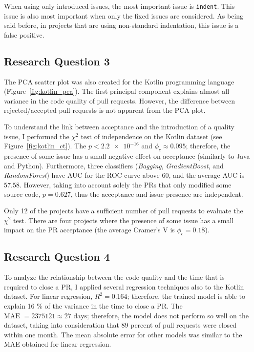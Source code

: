 \documentclass[digital,oneside,oldtable,nolof,nolot,nocover]{fithesis4}
\begin{document}
When using only introduced issues, the most important issue is \texttt{indent}.
This issue is also most important when only the fixed issues are considered.
As being said before, in projects that are using non-standard indentation,
this issue is a false positive.
\subsection{Research Question 3}
\label{sec:org53a6f45}
The PCA scatter plot was also created for the Kotlin programming language (Figure~\ref{fig:kotlin_pca}).
The first principal component explains almost all variance in the code quality of pull requests.
However, the difference between rejected/accepted pull requests is not apparent from the PCA plot.

To understand the link between acceptance and the introduction of a
quality issue, I performed the \(\chi^2\) test of independence
on the Kotlin dataset (see Figure~\ref{fig:kotlin_ct}).
The \(p < \num{2.2e-16}\) and \(\phi_c \approx 0.095\); therefore, the presence of some issue has a small
negative effect on acceptance (similarly to Java and Python).
Furthermore, three classifiers (\emph{Bagging}, \emph{GradientBoost}, and \emph{RandomForest})
have AUC for the ROC curve above 60, and the average AUC is \(57.58\).
However, taking into account solely the PRs that only modified some source
code, \(p = 0.627\), thus the acceptance and issue presence are independent.

Only 12 of the projects have a sufficient number of pull requests to evaluate
the \(\chi^2\) test. There are four projects where the presence of some issue
has a small impact on the PR acceptance (the average Cramer's V is \(\phi_c = 0.18\)).
\subsection{Research Question 4}
\label{sec:orge136ede}
To analyze the relationship between the code quality and the time that is required to
close a PR, I applied several regression techniques also to the Kotlin
dataset.  For linear regression, \(R^2 = 0.164\); therefore, the trained model is
able to explain 16 \% of the variance in the time to close a PR. The \(\text{MAE } =
    2375121 \approx 27\text{ days}\); therefore, the model does not perform so well
on the dataset, taking into consideration that 89 percent of pull requests were
closed within one month. The mean absolute error for other models was similar
to the MAE obtained for linear regression.
\FloatBarrier
\end{document}

